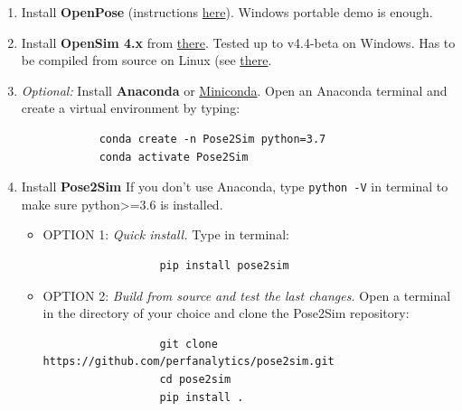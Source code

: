 \begin{enumerate}[itemsep=0em, topsep=0em, leftmargin=*]
      \item Install \textbf{OpenPose} (instructions \href{https://github.com/CMU-Perceptual-Computing-Lab/openpose/blob/master/doc/installation/0_index.md}{here}).\newline
      Windows portable demo is enough.
      \item Install \textbf{OpenSim 4.x} from \href{https://simtk.org/frs/index.php?group_id=91}{there}.\newline
      Tested up to v4.4-beta on Windows. Has to be compiled from source on Linux (see \href{https://simtk-confluence.stanford.edu:8443/display/OpenSim/Linux+Support}{there}.
      \item \textit{Optional:} Install \textbf{Anaconda} or \href{https://docs.conda.io/en/latest/miniconda.html}{Miniconda}.\newline
      Open an Anaconda terminal and create a virtual environment by typing:
      \begin{verbatim}
            conda create -n Pose2Sim python=3.7
            conda activate Pose2Sim
      \end{verbatim}
      \item Install \textbf{Pose2Sim}\newline
      If you don't use Anaconda, type \texttt{python -V} in terminal to make sure python>=3.6 is installed.
      \begin{itemize}
            \item OPTION 1: \textit{Quick install.} Type in terminal:
            \begin{verbatim}
                  pip install pose2sim
            \end{verbatim}
            \item OPTION 2: \textit{Build from source and test the last changes.} Open a terminal in the directory of your choice and clone the Pose2Sim repository:
            \begin{verbatim}
                  git clone https://github.com/perfanalytics/pose2sim.git
                  cd pose2sim
                  pip install .
            \end{verbatim}
      \end{itemize}
\end{enumerate}

